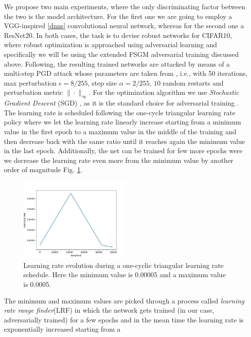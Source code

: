 \documentclass[LaM,binding=0.6cm]{./packages/sapthesis/sapthesis}
\begin{document}
We propose two main experiments, where the only discriminating factor between the 
two is the model architecture. For the first one we are going to employ a VGG-inspired
\ref{dnns} convolutional neural network, whereas for the second one a ResNet20. In
both cases, the task is to devise robust networks for CIFAR10, where robust optimization 
is approached using adversarial learning and specifically we will be using the extended 
FSGM adversarial training discussed above. Following, the resulting trained networks 
are attacked by means of a multi-step PGD attack whose parameters are taken from 
\cite{fast_adv_train}, i.e., with 50 iterations, max perturbation $\epsilon = 8/255$, step size $\alpha = 2/255$, $10$ random restarts
and perturbation metric $\| \cdot \|_{\infty}$. For the optimization algorithm we use 
\textit{Stochastic Gradient Descent } (SGD) \cite{sgd}, as it is the standard choice for 
adversarial training \cite{towards_eval_robustness}. The learning rate is scheduled following
the one-cycle triangular learning rate policy where we let the learning rate linearly 
increase starting from a minimum value in the first epoch to a maximum value in the 
middle of the training and then decrease back with the same ratio until it reaches 
again the minimum value in the last epoch. Additionally, the net can be trained for 
few more epochs were we decrease the learning rate even more from the minimum value 
by another order of magnitude Fig. \ref{fig:oclr}.
\begin{figure}[h]
    \centering
    \includegraphics[width=0.50\textwidth]{oclrp}
    \caption{Learning rate evolution during a one-cyclic triangular learning rate schedule.
    Here the minimum value is 0.00005 and a maximum value is 0.0005.}
    \label{fig:oclr}
\end{figure}
The minimum and maximum values are picked through a process called \textit{learning 
rate range finder}(LRF) in which the network gets trained (in our case, adversarially trained)
for a few epochs and in the mean time the learning rate is exponentially increased starting from a 
\end{document}

